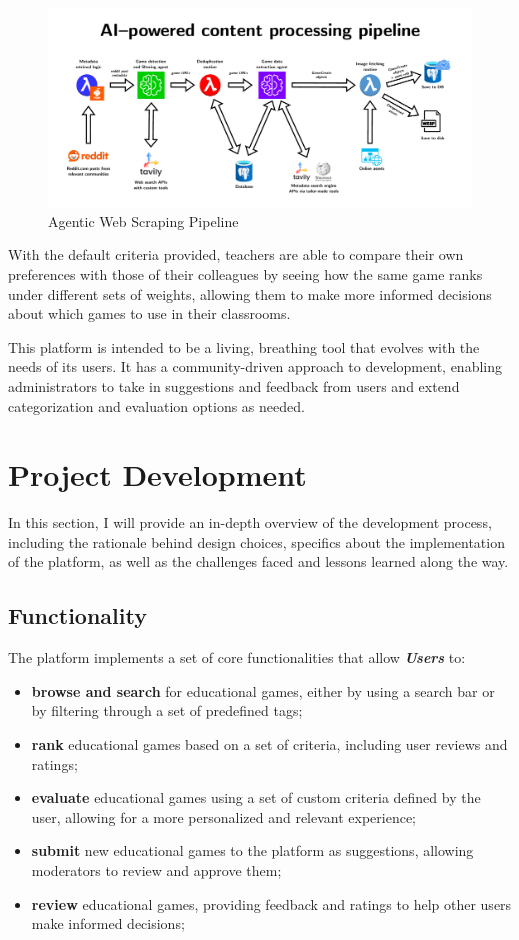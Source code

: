 \documentclass[11pt,italian,a4paper]{article}
\begin{document}
\begin{figure}[H]
    \centering
    \includegraphics[width=\textwidth]{figures/pdfs/ai_pipeline.pdf}
    \caption{Agentic Web Scraping Pipeline}
\end{figure}

With the default criteria provided, teachers are able to compare their own preferences with those of their colleagues by seeing how the same game ranks under different sets of weights, allowing them to make more informed decisions about which games to use in their classrooms.

This platform is intended to be a living, breathing tool that evolves with the needs of its users. It has a community-driven approach to development, enabling administrators to take in suggestions and feedback from users and extend categorization and evaluation options as needed.

\section{Project Development}

In this section, I will provide an in-depth overview of the development process, including the rationale behind design choices, specifics about the implementation of the platform, as well as the challenges faced and lessons learned along the way.

\subsection{Functionality}

The platform implements a set of core functionalities that allow \textbf{\textit{Users}} to:
\begin{itemize}
    \item \textbf{browse and search} for educational games, either by using a search bar or by filtering through a set of predefined tags;
    \item \textbf{rank} educational games based on a set of criteria, including user reviews and ratings;
    \item \textbf{evaluate} educational games using a set of custom criteria defined by the user, allowing for a more personalized and relevant experience;
    \item \textbf{submit} new educational games to the platform as suggestions, allowing moderators to review and approve them;
    \item \textbf{review} educational games, providing feedback and ratings to help other users make informed decisions;
\end{itemize}
\end{document}

